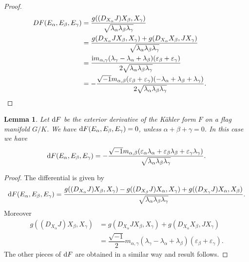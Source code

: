 \documentclass[pdftex]{sigma}%
\numberwithin{equation}{section}
\newtheorem{Lemma}[Theorem]{Lemma}
\begin{document}
\begin{proof}
\begin{align*}
DF(E_{\alpha},E_{\beta},E_{\gamma})&=
\dfrac{g((D_{X_{\alpha}}J)X_{\beta},X_{\gamma})}{\sqrt{\lambda_{\alpha}\lambda_{\beta}\lambda_{\gamma}}}
\\
&=\dfrac{g(D_{X_{\alpha}}JX_{\beta},X_{\gamma})+g(D_{X_{\alpha}}X_{\beta},JX_{\gamma})}
{\sqrt{\lambda_{\alpha}\lambda_{\beta}\lambda_{\gamma}}}
\\
&=\dfrac{{\rm i}m_{\alpha,\gamma}(\lambda_{\gamma}-\lambda_{\alpha}+\lambda_{\beta})
(\varepsilon_{\beta}+\varepsilon_{\gamma})}{2\sqrt{\lambda_{\alpha}\lambda_{\beta}\lambda_{\gamma}}}
\\
&=-\dfrac{\sqrt{-1}m_{\alpha,\beta}(\varepsilon_{\beta}+\varepsilon_{\gamma})(-\lambda_{\alpha} +\lambda_{\beta}+\lambda_{\gamma})}{2\sqrt{\lambda_{\alpha}\lambda_{\beta}\lambda_{\gamma}}}.\tag*{\qed}
\end{align*}
\renewcommand{\qed}{}
\end{proof}



\begin{Lemma}
Let ${\rm d}F$ be the exterior derivative of the K\"ahler form $F$ on a flag manifold $G/K$. We have ${\rm d}F(E_{\alpha},E_{\beta},E_{\gamma})=0$, unless $\alpha+\beta+\gamma=0$. In this case we have
\begin{gather}
{\rm d}F(E_{\alpha},E_{\beta},E_{\gamma})=-\dfrac{\sqrt{-1}m_{\alpha,\beta} (\varepsilon_{\alpha}\lambda_{\alpha}+\varepsilon_{\beta}\lambda_{\beta} +\varepsilon_{\gamma}\lambda_{\gamma})}{\sqrt{\lambda_{\alpha}\lambda_{\beta}\lambda_{\gamma}}}.
\end{gather}
\end{Lemma}
\begin{proof}
The differential is given by
\begin{gather*}
{\rm d}F(E_{\alpha},E_{\beta},E_{\gamma})=\dfrac{g((D_{X_{\alpha}}J)X_{\beta},X_{\gamma}) -g((D_{X_{\beta}}J)X_{\alpha},X_{\gamma})+g((D_{X_{\gamma}}J)X_{\alpha},X_{\beta})} {\sqrt{\lambda_{\alpha}\lambda_{\beta}\lambda_{\gamma}}}.
\end{gather*}
Moreover
\begin{align*}
g((D_{X_{\alpha}}J)X_{\beta},X_{\gamma})&=g(D_{X_{\alpha}}JX_{\beta},X_{\gamma}) +g(D_{X_{\alpha}}X_{\beta},JX_{\gamma})
\\
&=\dfrac{\sqrt{-1}}{2}m_{\alpha,\gamma}(\lambda_{\gamma}-\lambda_{\alpha} +\lambda_{\beta})(\varepsilon_{\beta}+\varepsilon_{\gamma}).
\end{align*}
The other pieces of ${\rm d}F$ are obtained in a similar way and result follows.
\end{proof}
\end{document}
